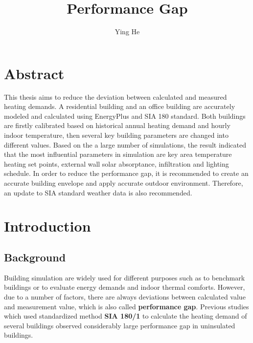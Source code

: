 \documentclass[11pt, a4paper]{article}
\title{Performance Gap}
\author{Ying He}
\theoremstyle{definition}
\newcommand{\matx}[4]{\begin{pmatrix} #1 & #2 \\ #3 & #4 \end{pmatrix}}
\newcommand{\hlor}{\colorbox{Apricot}} %
\begin{document}
\begin{comment}
	\begin{landscape}
	\begin{multicols*}{3}
\end{comment}

\begin{comment}
\textbf{abcdefg}





\hlor{abcd}

\[\matx{1}{2}{3}{4}\] al;dfjajfa

woyaozaizhedazi $\matx{1}{2}{3}{4}$



\[\alpha \cdot \beta \]
123456789/*
\end{comment}
\maketitle

\newpage
\tableofcontents

\section{Abstract}
This thesis aims to reduce the deviation between calculated and measured heating demands. A residential building and an office building are accurately modeled and calculated using EnergyPlus and SIA 180 standard. Both buildings are firstly calibrated based on historical annual heating demand and hourly indoor temperature, then several key building parameters are changed into different values. Based on the a large number of simulations, the result indicated that the most influential parameters in simulation are key area temperature heating set points, external wall solar absorptance, infiltration and lighting schedule. In order to reduce the performance gap, it is recommended to create an accurate building envelope and apply accurate outdoor environment. Therefore, an update to SIA standard weather data is also recommended.
\cite{FREI2017421}

\section{Introduction}
	\subsection{Background}
		Building simulation are widely used for different purposes such as to benchmark buildings or to evaluate energy demands and indoor thermal comforts. However, due to a number of factors, there are always deviations between calculated value and measurement value, which is also called \textbf{performance gap}. Previous studies which used standardized method \textbf{SIA 180/1} to calculate the heating demand of several buildings observed considerably large performance gap in uninsulated buildings.
	
\end{document}
